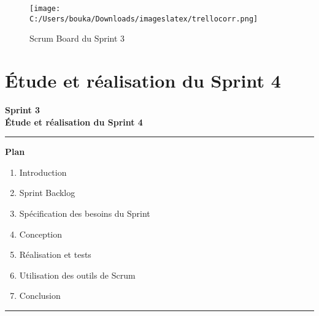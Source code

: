 \documentclass[a4paper,11pt]{report}
\begin{document}
\begin{figure}[H]
  \centering
  \texttt{[image: C:/Users/bouka/Downloads/imageslatex/trellocorr.png]}
  \caption{Scrum Board du Sprint 3}
  \label{fig:clone-result}
\end{figure}







\newpage

\chapter{Étude et réalisation du Sprint 4}
\thispagestyle{empty}

\vspace{2cm}
\begin{center}
  {\Huge\bfseries Sprint 3}\\[0.8em]
  {\LARGE\bfseries Étude et réalisation du Sprint 4}
\end{center}

\vspace{1.5cm}
\begin{center}
  \color{blue!60!black}\rule{0.6\textwidth}{1pt}
\end{center}
\vspace{1.5cm}

\begin{center}
  {\huge\bfseries Plan}\\[0.5em]
\end{center}
\vspace{1em}

\begin{enumerate}[%
  label=\bfseries\Large\arabic*., 
  leftmargin=2cm, 
  itemsep=1em
]
   \item Introduction
  \item Sprint Backlog
  \item Spécification des besoins du Sprint
  \item Conception
  \item Réalisation et tests
  \item Utilisation des outils de Scrum
  \item Conclusion
\end{enumerate}

\vfill
\begin{center}
  \color{blue!60!black}\rule{0.6\textwidth}{0.8pt}
\end{center}
\end{document}
